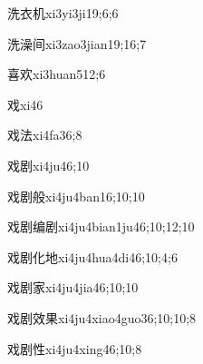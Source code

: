 \begin{verbete}{洗衣机}{xi3yi3ji1}{9;6;6}
\end{verbete}

\begin{verbete}{洗澡间}{xi3zao3jian1}{9;16;7}
\end{verbete}

\begin{verbete}{喜欢}{xi3huan5}{12;6}
\end{verbete}

\begin{verbete}{戏}{xi4}{6}
\end{verbete}

\begin{verbete}{戏法}{xi4fa3}{6;8}
\end{verbete}

\begin{verbete}{戏剧}{xi4ju4}{6;10}
\end{verbete}

\begin{verbete}{戏剧般}{xi4ju4ban1}{6;10;10}
\end{verbete}

\begin{verbete}{戏剧编剧}{xi4ju4bian1ju4}{6;10;12;10}
\end{verbete}

\begin{verbete}{戏剧化地}{xi4ju4hua4di4}{6;10;4;6}
\end{verbete}

\begin{verbete}{戏剧家}{xi4ju4jia4}{6;10;10}
\end{verbete}

\begin{verbete}{戏剧效果}{xi4ju4xiao4guo3}{6;10;10;8}
\end{verbete}

\begin{verbete}{戏剧性}{xi4ju4xing4}{6;10;8}
\end{verbete}

